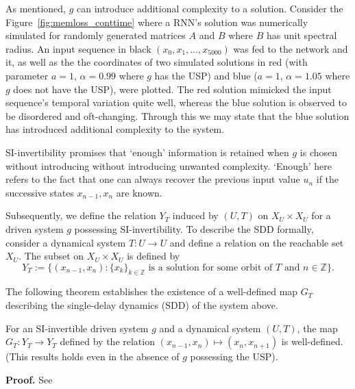 As mentioned, $g$ can introduce additional complexity to a solution. Consider the Figure~\ref{fig:memloss_conttime} where a RNN's solution was numerically simulated for randomly generated matrices $A$ and $B$ where $B$ has unit spectral radius.
An input sequence in black $(x_0,x_1,\ldots,x_{5000})$ was fed to the network and it, as well as the the coordinates of two simulated solutions in red (with parameter $a=1$, $\alpha=0.99$ where $g$ has the USP) and blue ($a=1$, $\alpha=1.05$ where $g$ does not have the USP), were plotted.
The red solution mimicked the input sequence's temporal variation quite well, whereas the blue solution is observed to be disordered and oft-changing. Through this we may state that the blue solution has introduced additional complexity to the system. 

SI-invertibility promises that `enough' information is retained when $g$ is chosen without introducing without introducing unwanted complexity. 
`Enough' here refers to the fact that one can always recover the previous input value $u_n$ if the successive states $x_{n-1}, x_n$ are known.

Subsequently, we define the relation $Y_T$ induced by $(U,T)$ on $X_U\times{X_U}$ for a driven system $g$ possessing SI-invertibility.  
To describe the  SDD formally, consider a dynamical system $T: U \to U$ and define a relation on the reachable set $X_U$. The subset on $X_U \times X_U$  is defined by 
\begin{equation}
  Y_T:=\{(x_{n-1},x_n): {\{x_k\}}_{k\in \mathbb{Z}} \mbox{ is a solution for some orbit of } T \mbox{ and } n \in \mathbb{Z}\}.  
\end{equation}

The following theorem establishes the existence of a well-defined map $G_T$ describing the single-delay dynamics (SDD) of the system above. 

\begin{Theorem}\label{Thm_GT_Exists}
  For an SI-invertible driven system $g$ and a dynamical system $(U,T)$, the map $G_T: Y_T \to Y_T$ defined by the relation $(x_{n-1},x_n) \mapsto (x_n,x_{n+1})$ is well-defined. 
  (This results holds even in the absence of $g$ possessing the USP). 
  \end{Theorem}
  \vspace{-6mm}
  {\bf Proof.} See~\cite[Theorem.3]{Supp}

